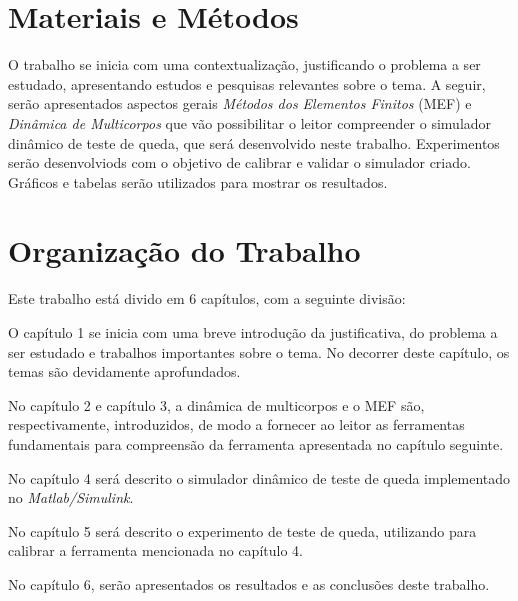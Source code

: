 \section{Materiais e Métodos}

O trabalho se inicia com uma contextualização, justificando o problema a ser estudado, apresentando estudos e pesquisas relevantes sobre o tema.
A seguir, serão apresentados aspectos gerais \textit{Métodos dos Elementos Finitos} (MEF) e \textit{Dinâmica de Multicorpos} que vão possibilitar o leitor compreender o simulador dinâmico de teste de queda, que será desenvolvido neste trabalho.
Experimentos serão desenvolviods com o objetivo de calibrar e validar o simulador criado.
Gráficos e tabelas serão utilizados para mostrar os resultados.

\section{Organização do Trabalho}

Este trabalho está divido em 6 capítulos, com a seguinte divisão:

O capítulo 1 se inicia com uma breve introdução da justificativa, do problema a ser estudado e trabalhos importantes sobre o tema. No decorrer deste capítulo, os temas são devidamente aprofundados.

No capítulo 2 e capítulo 3, a dinâmica de multicorpos e o MEF são, respectivamente, introduzidos, de modo a fornecer ao leitor as ferramentas fundamentais para compreensão da ferramenta apresentada no capítulo seguinte. 

No capítulo 4 será descrito o simulador dinâmico de teste de queda implementado no \textit{Matlab/Simulink}.

No capítulo 5 será descrito o experimento de teste de queda, utilizando para calibrar a ferramenta mencionada no capítulo 4.

No capítulo 6, serão apresentados os resultados e as conclusões deste trabalho.






